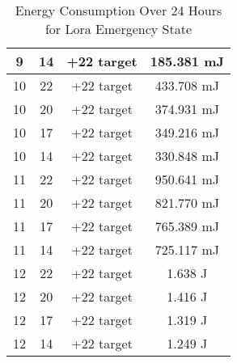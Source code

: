\begin{table*}[ht!]
\begin{tabularx}{\columnwidth}{c c c c}
    9 & 14 & +22 target & 185.381 mJ \\
    \midrule
    10 & 22 & +22 target & 433.708 mJ \\
    10 & 20 & +22 target & 374.931 mJ \\
    10 & 17 & +22 target & 349.216 mJ \\
    10 & 14 & +22 target & 330.848 mJ \\
    \midrule
    11 & 22 & +22 target & 950.641 mJ \\
    11 & 20 & +22 target & 821.770 mJ \\
    11 & 17 & +22 target & 765.389 mJ \\
    11 & 14 & +22 target & 725.117 mJ \\
    \midrule
    12 & 22 & +22 target & 1.638 J \\
    12 & 20 & +22 target & 1.416 J \\
    12 & 17 & +22 target & 1.319 J \\
    12 & 14 & +22 target & 1.249 J \\
    \bottomrule
    \end{tabularx}
    \caption{Energy Consumption Over 24 Hours for Lora Emergency State}
    \label{tab:energy_consumption_24h_revised}
\end{table*}


